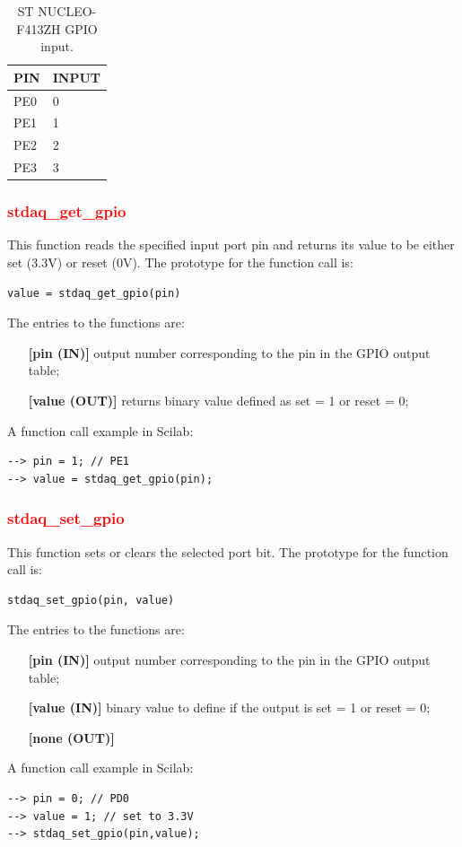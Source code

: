 \documentclass[letterpaper,10pt,english]{hitec}
\begin{document}
\begin{table}[h]
\caption{ST NUCLEO-F413ZH GPIO input.}
\centering
\begin{tabular}{|ll|}
 \textbf{PIN} & \textbf{INPUT} \\ \hline
 PE0 & 0 \\
 PE1 & 1 \\
 PE2 & 2 \\
 PE3 & 3 
\end{tabular}
\end{table}

\subsubsection{\textcolor{red}{stdaq\_get\_gpio}}
This function reads the specified input port pin and returns its value to be either set (3.3V) or reset (0V).
The prototype for the function call is: 
\begin{verbatim}
value = stdaq_get_gpio(pin)
\end{verbatim}
The entries to the functions are:
\begin{itemize}
\item [\textbf{[pin (IN)]}] output number corresponding to the pin in the GPIO output table;
\item [\textbf{[value (OUT)]}] returns binary value defined as set = 1 or reset = 0;
\end{itemize}
A function call example in Scilab:
\begin{verbatim}
--> pin = 1; // PE1
--> value = stdaq_get_gpio(pin);
\end{verbatim}

\subsubsection{\textcolor{red}{stdaq\_set\_gpio}}
This function sets or clears the selected port bit.
The prototype for the function call is: 
\begin{verbatim}
stdaq_set_gpio(pin, value)
\end{verbatim}
The entries to the functions are:
\begin{itemize}
\item [\textbf{[pin (IN)]}] output number corresponding to the pin in the GPIO output table;
\item [\textbf{[value (IN)]}] binary value to define if the output is set = 1 or reset = 0;
\item [\textbf{[none (OUT)]}]
\end{itemize}
A function call example in Scilab:
\begin{verbatim}
--> pin = 0; // PD0
--> value = 1; // set to 3.3V
--> stdaq_set_gpio(pin,value);
\end{verbatim}
\end{document}
